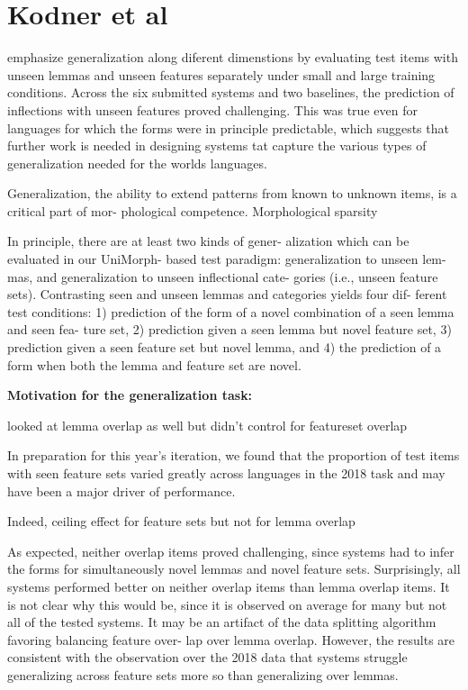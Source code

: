 \documentclass[11pt]{article}
\begin{document}
\section{Kodner et al}



\citet{kodner-etal-2022-sigmorphon} emphasize generalization along diferent dimenstions by evaluating test items with unseen lemmas and unseen features separately under small and large training conditions. 
Across the six submitted systems and two baselines, the prediction of inflections with unseen features proved challenging. 
This was true even for languages for which the forms were in principle predictable, which suggests that further work is needed in designing systems tat capture the various types of generalization needed for the worlds languages. 


Generalization, the ability to extend patterns from known to unknown items, is a critical part of mor- phological competence. 
Morphological sparsity 

In principle, there are at least two kinds of gener- alization which can be evaluated in our UniMorph- based test paradigm: generalization to unseen lem- mas, and generalization to unseen inflectional cate- gories (i.e., unseen feature sets). Contrasting seen and unseen lemmas and categories yields four dif- ferent test conditions: 1) prediction of the form of a novel combination of a seen lemma and seen fea- ture set, 2) prediction given a seen lemma but novel feature set, 3) prediction given a seen feature set but novel lemma, and 4) the prediction of a form when both the lemma and feature set are novel.

\textbf{Motivation for the generalization task:} 

\citet{pimentel-ryskina-etal-2021-sigmorphon} looked at lemma overlap as well but didn't control for featureset overlap 

In preparation for this year’s iteration, we found that the proportion of test items with seen feature sets varied greatly across languages in the 2018 task and may have been a major driver of performance. 

Indeed, ceiling effect for feature sets but not for lemma overlap 


As expected, neither overlap items proved challenging, since systems had to infer the forms for simultaneously novel lemmas and novel feature sets. Surprisingly, all systems performed better on neither overlap items than lemma overlap items. It is not clear why this would be, since it is observed on average for many but not all of the tested systems. It may be an artifact of the data splitting algorithm favoring balancing feature over- lap over lemma overlap. However, the results are consistent with the observation over the 2018 data that systems struggle generalizing across feature sets more so than generalizing over lemmas.
\end{document}

